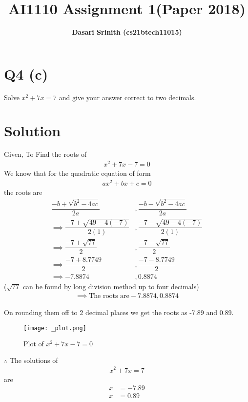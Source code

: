 \documentclass[12pt,letterpaper,twocolumn]{article}
\title{\textbf{AI1110 Assignment 1(Paper 2018)}}
\author{\textbf{Dasari Srinith (cs21btech11015)}}
\date{}
\begin{document}
\maketitle

\section*{Q4 (c)}
    Solve $x^2 + 7x = 7$ and give your answer correct to two decimals.
\vspace{-0.5cm}
\section*{Solution}

    Given,
    To Find the roots of
    \begin{align}
        x^2 +7x -7 = 0
    \end{align}
    We know that for the quadratic equation of form
    \begin{align}
        ax^2 + bx +c = 0
    \end{align}
    the roots are
    \begin{align}
        \dfrac{-b+\sqrt{b^2 -4ac}}{2a}&,\dfrac{-b-\sqrt{b^2 -4ac}}{2a}\\[10pt]
        \implies \dfrac{-7+\sqrt{49-4(-7)}}{2(1)}&,
        \dfrac{-7-\sqrt{49 -4(-7)}}{2(1)}\\[10pt]
        \implies \dfrac{-7+\sqrt{77}}{2}&,
        \dfrac{-7-\sqrt{77}}{2}\\[10pt]
        \implies \dfrac{-7+8.7749}{2} &,\dfrac{-7-8.7749}{2}\\[10pt]
        \implies -7.8874 &, 0.8874
    \end{align}
($\sqrt{77}$ can be found by long division method up to four decimals)
\begin{align}
    \implies \text{The roots are} -7.8874, 0.8874
\end{align}

    
On rounding them off to 2 decimal places we get the roots as -7.89 and 0.89.
    
\begin{figure}
    \centering
    \texttt{[image: \_plot.png]}
    \caption{Plot of $x^2+7x-7=0$}
    \label{fig: Figure 1}
\end{figure}
 
$\therefore$ The solutions of 
\begin{align}
    x^2 + 7x = 7
\end{align}
are
\begin{align}
    x &= -7.89\\
    x &= 0.89
\end{align}
    
\end{document}
